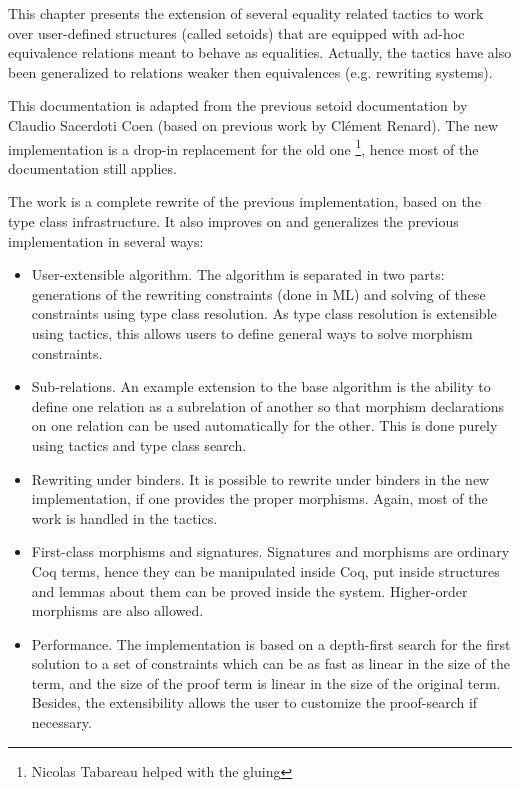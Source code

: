 \newtheorem{cscexample}{Example}

\label{setoid_replace}

This chapter presents the extension of several equality related tactics to
work over user-defined structures (called setoids) that are equipped with
ad-hoc equivalence relations meant to behave as equalities.
Actually, the tactics have also been generalized to relations weaker then
equivalences (e.g. rewriting systems).

This documentation is adapted from the previous setoid documentation by
Claudio Sacerdoti Coen (based on previous work by Cl\'ement Renard).
The new implementation is a drop-in replacement for the old one \footnote{Nicolas
Tabareau helped with the gluing}, hence most of the documentation still applies.

The work is a complete rewrite of the previous implementation, based on
the type class infrastructure. It also improves on and generalizes
the previous implementation in several ways:
\begin{itemize}
\item User-extensible algorithm. The algorithm is separated in two
  parts: generations of the rewriting constraints (done in ML) and
  solving of these constraints using type class resolution. As type
  class resolution is extensible using tactics, this allows users to define
  general ways to solve morphism constraints.
\item Sub-relations. An example extension to the base algorithm is the
  ability to define one relation as a subrelation of another so that
  morphism declarations on one relation can be used automatically for
  the other. This is done purely using tactics and type class search.
\item Rewriting under binders. It is possible to rewrite under binders
  in the new implementation, if one provides the proper
  morphisms. Again, most of the work is handled in the tactics.
\item First-class morphisms and signatures. Signatures and morphisms are
  ordinary Coq terms, hence they can be manipulated inside Coq, put
  inside structures and lemmas about them can be proved inside the
  system. Higher-order morphisms are also allowed.
\item Performance. The implementation is based on a depth-first search for the first
  solution to a set of constraints which can be as fast as linear in the
  size of the term, and the size of the proof term is linear
  in the size of the original term. Besides, the extensibility allows the
  user to customize the proof-search if necessary.
\end{itemize}

